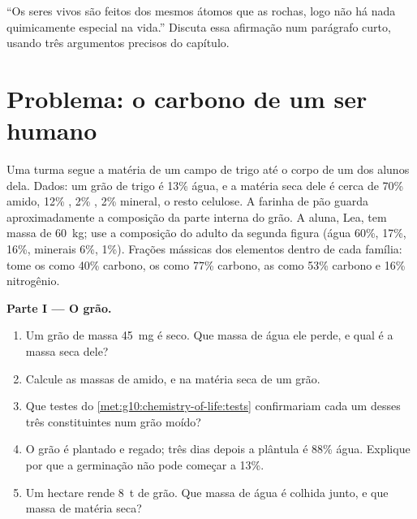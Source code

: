 \begin{exercise}[$\star\star\star$]\label{exo:g10:chemistry-of-life:15}
``Os seres vivos são feitos dos mesmos átomos que as rochas, logo não
há nada quimicamente especial na vida.'' Discuta essa afirmação num
parágrafo curto, usando três argumentos precisos do capítulo.
\end{exercise}

\section{Problema: o carbono de um ser humano}

\begin{problem}
\label{pb:g10:chemistry-of-life:1}
Uma turma segue a matéria de um campo de trigo até o corpo de um dos
alunos dela. Dados: um grão de trigo é 13\% água, e a matéria seca dele
é cerca de 70\% amido, 12\% , 2\% , 2\% mineral, o resto
celulose. A farinha de pão guarda aproximadamente a composição da parte
interna do grão. A aluna, Lea, tem massa de \qty{60}{kg}; use a
composição do adulto da segunda figura (água 60\%,  17\%,
 16\%, minerais 6\%,  1\%). Frações mássicas dos
elementos dentro de cada família: tome os  como 40\%
carbono, os  como 77\% carbono, as  como 53\% carbono e
16\% nitrogênio.

\medskip
\noindent\textbf{Parte I --- O grão.}
\begin{enumerate}
  \item Um grão de massa \qty{45}{mg} é seco. Que massa de água ele
        perde, e qual é a massa seca dele?
  \item Calcule as massas de amido,  e  na matéria seca
        de um grão.
  \item Que testes do \cref{met:g10:chemistry-of-life:tests}
        confirmariam cada um desses três constituintes num grão moído?
  \item O grão é plantado e regado; três dias depois a plântula é 88\%
        água. Explique por que a germinação não pode começar a 13\%.
  \item Um hectare rende \qty{8}{t} de grão. Que massa de água é
        colhida junto, e que massa de matéria seca?
\end{enumerate}


\end{problem}
